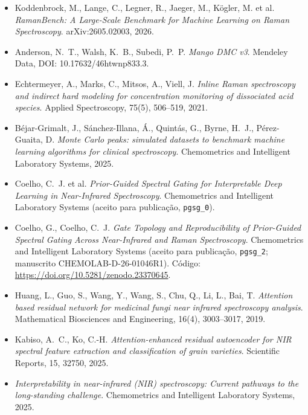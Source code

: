 \documentclass[11pt,a4paper]{article}
\begin{document}
\begin{itemize}
\item Koddenbrock, M., Lange, C., Legner, R., Jaeger, M., Kögler, M. et al. \emph{RamanBench: A Large-Scale Benchmark for Machine Learning on Raman Spectroscopy}. arXiv:2605.02003, 2026.
\item Anderson, N.~T., Walsh, K.~B., Subedi, P.~P. \emph{Mango DMC v3}. Mendeley Data, DOI: 10.17632/46htwnp833.3.
\item Echtermeyer, A., Marks, C., Mitsos, A., Viell, J. \emph{Inline Raman spectroscopy and indirect hard modeling for concentration monitoring of dissociated acid species}. Applied Spectroscopy, 75(5), 506--519, 2021.
\item Béjar-Grimalt, J., Sánchez-Illana, Á., Quintás, G., Byrne, H.~J., Pérez-Guaita, D. \emph{Monte Carlo peaks: simulated datasets to benchmark machine learning algorithms for clinical spectroscopy}. Chemometrics and Intelligent Laboratory Systems, 2025.
\item Coelho, C.~J. et al. \emph{Prior-Guided Spectral Gating for Interpretable Deep Learning in Near-Infrared Spectroscopy}. Chemometrics and Intelligent Laboratory Systems (aceito para publicação, \texttt{pgsg\_0}).
\item Coelho, G., Coelho, C.~J. \emph{Gate Topology and Reproducibility of Prior-Guided Spectral Gating Across Near-Infrared and Raman Spectroscopy}. Chemometrics and Intelligent Laboratory Systems (aceito para publicação, \texttt{pgsg\_2}; manuscrito CHEMOLAB-D-26-01046R1). Código: \url{https://doi.org/10.5281/zenodo.23370645}.
\item Huang, L., Guo, S., Wang, Y., Wang, S., Chu, Q., Li, L., Bai, T. \emph{Attention based residual network for medicinal fungi near infrared spectroscopy analysis}. Mathematical Biosciences and Engineering, 16(4), 3003--3017, 2019.
\item Kabiso, A.~C., Ko, C.-H. \emph{Attention-enhanced residual autoencoder for NIR spectral feature extraction and classification of grain varieties}. Scientific Reports, 15, 32750, 2025.
\item \emph{Interpretability in near-infrared (NIR) spectroscopy: Current pathways to the long-standing challenge}. Chemometrics and Intelligent Laboratory Systems, 2025.
\end{itemize}
\end{document}
